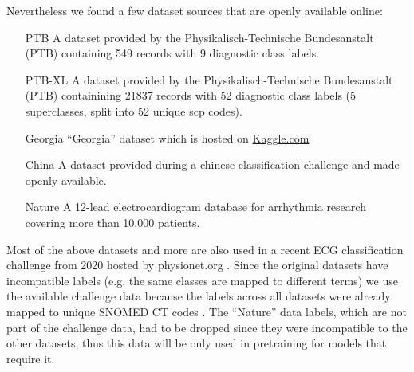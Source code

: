 Nevertheless we found a few dataset sources that are openly available online:
\begin{itemize}
	\item[PTB] A dataset provided by the Physikalisch-Technische Bundesanstalt (PTB) containing 549 records with 9 diagnostic class labels. \autocite{ptb}
	\item[PTB-XL] A dataset provided by the Physikalisch-Technische Bundesanstalt (PTB) containining 21837 records with 52 diagnostic class labels (5 superclasses, split into 52 unique scp codes).\autocite{ptbxl}
	\item[Georgia] \enquote{Georgia} dataset which is hosted on \url{Kaggle.com} \autocite{Georgia12LeadECGChallengeDatabaseKaggle-2021-03-15}
	\item[China] A dataset provided during a chinese classification challenge and made openly available.
	\item[Nature] A 12-lead electrocardiogram database for arrhythmia research covering more than 10,000 patients. \autocite{Zheng2020}
	\label{itm:itemize-datas}
\end{itemize}
Most of the above datasets and more are also used in a recent ECG classification challenge from 2020 \autocite{PerezAlday2021} hosted by physionet.org \autocite{physionet}. Since the original datasets have incompatible labels (e.g. the same classes are mapped to different terms) we use the available challenge data because the labels across all datasets were already mapped to unique SNOMED CT codes \autocite{SNOMEDCTClasses}. The \enquote{Nature} data labels, which are not part of the challenge data, had to be dropped since they were incompatible to the other datasets, thus this data will be only used in pretraining for models that require it.

